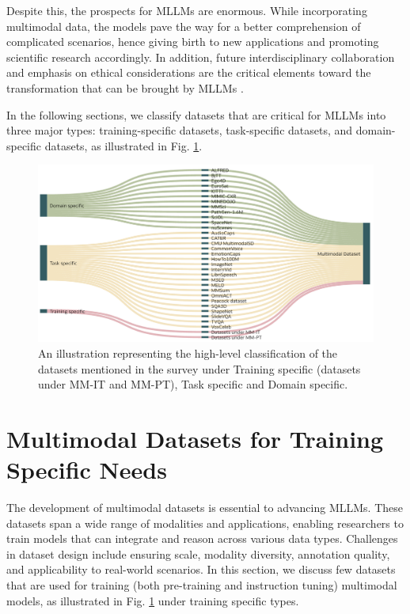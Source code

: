 \documentclass[runningheads]{llncs}
\begin{document}
Despite this, the prospects for MLLMs are enormous. While incorporating multimodal data, the models pave the way for a better comprehension of complicated scenarios, hence giving birth to new applications and promoting scientific research accordingly. In addition, future interdisciplinary collaboration and emphasis on ethical considerations are the critical elements toward the transformation that can be brought by MLLMs \cite{ref11}.

In the following sections, we classify datasets that are critical for MLLMs into three major types: training-specific datasets, task-specific datasets, and domain-specific datasets, as illustrated in Fig. \ref{fig:flowchart}.

    \begin{figure}[h!]
    \centering
    \includegraphics[width=\textwidth]{flowchart_hz.png} %
    \caption{An illustration representing the high-level classification of the datasets mentioned in the survey under Training specific (datasets under MM-IT and MM-PT), Task specific and Domain specific.}
    \label{fig:flowchart}
    \vspace{-1em}
\end{figure}
	
\section{Multimodal Datasets for Training Specific Needs}
The development of multimodal datasets is essential to advancing MLLMs. These datasets span a wide range of modalities and applications, enabling researchers to train models that can integrate and reason across various data types. Challenges in dataset design include ensuring scale, modality diversity, annotation quality, and applicability to real-world scenarios. In this section, we discuss few datasets that are used for training (both pre-training and instruction tuning) multimodal models, as illustrated in Fig. \ref{fig:flowchart} under training specific types.
\end{document}
